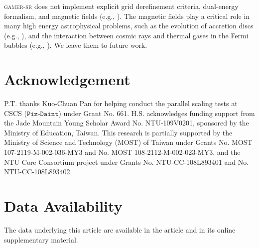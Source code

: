 \documentclass[twocolumn]{aastex63}
\begin{document}
\textsc{gamer-sr} does not implement explicit grid derefinement criteria, dual-energy formalism, and magnetic fields (e.g., \citealt{Stone2020}). The magnetic fields play a critical role in many high energy astrophysical problems, such as the evolution of accretion discs (e.g., \citealt{Blandford1982}), and the interaction between cosmic rays and thermal gases in the Fermi bubbles (e.g., \citealt{Yang2017}). We leave them to future work.


\section*{Acknowledgement}
P.T. thanks Kuo-Chuan Pan for helping conduct the parallel scaling tests at CSCS ($\texttt{Piz-Daint}$) under Grant No. 661.  H.S. acknowledges funding support from the Jade Mountain Young Scholar Award No. NTU-109V0201, sponsored by the Ministry of Education, Taiwan. This research is partially supported by the Ministry of Science and Technology (MOST) of Taiwan under Grants No. MOST 107-2119-M-002-036-MY3 and No. MOST 108-2112-M-002-023-MY3, and the NTU Core Consortium project under Grants No. NTU-CC-108L893401 and No. NTU-CC-108L893402.

\section*{Data Availability}
The data underlying this article are available in the article and in its online supplementary material.









\end{document}
